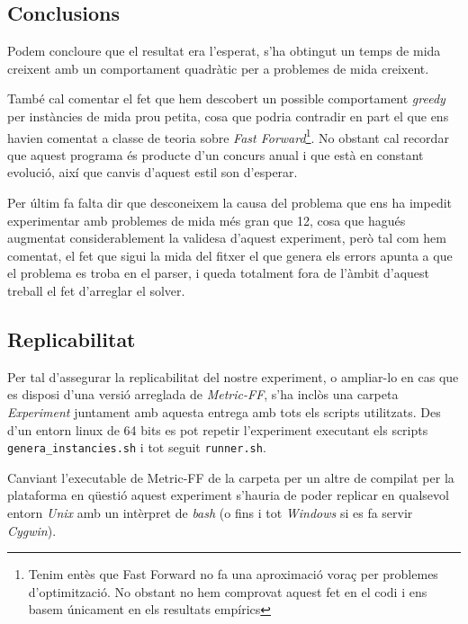 \documentclass[11pt,a4paper]{article}
\begin{document}
\subsection{Conclusions}

Podem concloure que el resultat era l'esperat, s'ha obtingut un temps de mida creixent amb un comportament quadràtic per a problemes de mida creixent.

També cal comentar el fet que hem descobert un possible comportament \emph{greedy} per instàncies de mida prou petita, cosa que podria contradir en part el que ens havien comentat a classe de teoria sobre \emph{Fast Forward}\footnote{Tenim entès que Fast Forward no fa una aproximació voraç per problemes d'optimització. No obstant no hem comprovat aquest fet en el codi i ens basem únicament en els resultats empírics}. No obstant cal recordar que aquest programa és producte d'un concurs anual i que està en constant evolució, així que canvis d'aquest estil son d'esperar.

Per últim fa falta dir que desconeixem la causa del problema que ens ha impedit experimentar amb problemes de mida més gran que 12, cosa que hagués augmentat considerablement la validesa d'aquest experiment, però tal com hem comentat, el fet que sigui la mida del fitxer el que genera els errors apunta a que el problema es troba en el parser, i queda totalment fora de l'àmbit d'aquest treball el fet d'arreglar el solver.

\subsection{Replicabilitat}

Per tal d'assegurar la replicabilitat del nostre experiment, o ampliar-lo en cas que es disposi d'una versió arreglada de \emph{Metric-FF}, s'ha inclòs una carpeta \emph{Experiment} juntament amb aquesta entrega amb tots els scripts utilitzats. Des d'un entorn linux de 64 bits es pot repetir l'experiment executant els scripts \texttt{genera\_instancies.sh} i tot seguit \texttt{runner.sh}. 

Canviant l'executable de Metric-FF de la carpeta per un altre de compilat per la plataforma en qüestió aquest experiment s'hauria de poder replicar en qualsevol entorn \emph{Unix} amb un intèrpret de \emph{bash} (o fins i tot \emph{Windows} si es fa servir \emph{Cygwin}).
\end{document}
